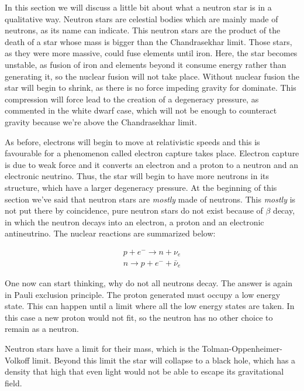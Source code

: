 \documentclass[a4paper]{article}
\begin{document}
In this section we will discuss a little bit about what a neutron star is in a qualitative way. Neutron stars are celestial bodies which are mainly made of neutrons, as its name can indicate. This neutron stars are the product of the death of a star whose mass is bigger than the Chandrasekhar limit. Those stars, as they were more massive, could fuse elements until iron. Here, the star becomes unstable, as fusion of iron and elements beyond it consume energy rather than generating it, so the nuclear fusion will not take place. Without  nuclear fusion the star will begin to shrink, as there is no force impeding gravity for dominate. This compression will force lead to the creation of a degeneracy pressure, as commented in the white dwarf case, which will not be enough to counteract gravity because we're above the Chandrasekhar limit. 

As before, electrons will begin to move at relativistic speeds and this is favourable for a phenomenon called electron capture takes place. Electron capture is due to weak force and it converts an electron and a proton to a neutron and an electronic neutrino. Thus, the star will begin to have more neutrons in its structure, which have a larger degeneracy pressure. At the beginning of this section we've said that neutron stars are \textit{mostly} made of neutrons. This \textit{mostly} is not put there by coincidence, pure neutron stars do not exist because of $\beta$ decay, in which the neutron decays into an electron, a proton and an electronic antineutrino. The nuclear reactions are summarized below:

\begin{align}
    p+e^-\rightarrow n+\nu_e\\
    n\rightarrow p+e^-+\bar{\nu}_e 
\end{align}

One now can start thinking, why do not all neutrons decay. The answer is again in Pauli exclusion principle. The proton generated must occupy a low energy state. This can happen until a limit where all the low energy states are taken. In this case a new proton would not fit, so the neutron has no other choice to remain as a neutron.

Neutron stars have a limit for their mass, which is the Tolman-Oppenheimer-Volkoff limit. Beyond this limit the star will collapse to a black hole, which has a density that high that even light would not be able to escape its gravitational field.
\end{document}
